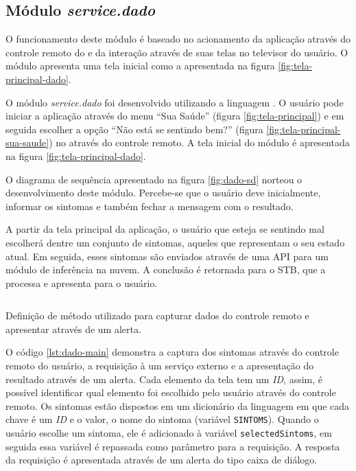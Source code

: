 \subsection{Módulo \textit{service.dado}}\label{subsubsec:dado}

O funcionamento deste módulo é baseado no acionamento da aplicação através
do controle remoto do \stb[] e da interação através de suas telas no televisor
do usuário. O módulo apresenta uma tela inicial como a apresentada na 
figura \vref{fig:tela-principal-dado}.

O módulo \textit{service.dado} foi desenvolvido utilizando a linguagem
\python[]. O usuário pode iniciar a aplicação através do menu ``Sua Saúde''
(figura \vref{fig:tela-principal}) e em seguida escolher a opção ``Não está se
sentindo bem?'' (figura \vref{fig:tela-principal-sua-saude}) no \stb[] através
do controle remoto. A tela inicial do módulo é  apresentada na figura
\vref{fig:tela-principal-dado}.

O diagrama de sequência apresentado na figura \ref{fig:dado-sd} norteou
o desenvolvimento deste módulo. Percebe-se que o usuário deve inicialmente,
informar os sintomas e também fechar a mensagem com o resultado.


A partir da tela principal da aplicação, o usuário que esteja se sentindo mal escolherá
dentre um conjunto de sintomas, aqueles que representam o seu estado atual. Em
seguida, esses sintomas são enviados através de uma API para um
módulo de inferência na nuvem. A conclusão é retornada para o STB, que a processa e 
apresenta para o usuário.

\begin{listing}[ht!]
\inputminted{python}{codigos/dado-main.py}
\caption{Definição de método utilizado para capturar dados do controle remoto
e apresentar através de um alerta.}
\label{lst:dado-main}
\end{listing}

O código \ref{lst:dado-main} demonstra a captura dos sintomas através do
controle remoto do usuário, a requisição à um serviço externo e a apresentação
do resultado através de um alerta. Cada elemento da tela tem um \textit{ID},
assim, é possível identificar qual elemento foi escolhido pelo usuário através
do controle remoto.  Os sintomas estão dispostos em um dicionário da linguagem
\python[] em que cada chave é um \textit{ID} e o valor, o nome do sintoma
(variável \texttt{SINTOMS}). Quando o usuário escolhe um sintoma, ele 
é adicionado à variável \texttt{selectedSintoms}, em seguida essa variável é
repassada como parâmetro para a requisição. A resposta da requisição é apresentada
através de um alerta do tipo caixa de diálogo.

